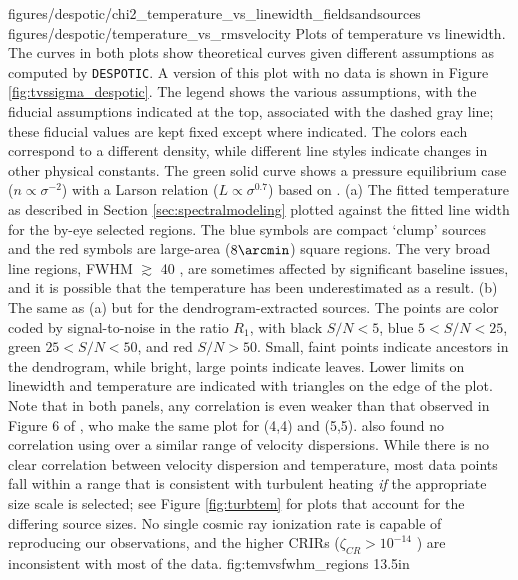 \FigureTwo
{figures/despotic/chi2_temperature_vs_linewidth_fieldsandsources} %
{figures/despotic/temperature_vs_rmsvelocity} %
{
Plots of temperature vs linewidth.  The curves in both plots show theoretical
curves given different assumptions as computed by \texttt{DESPOTIC}.  
A version of this plot with no data is shown in Figure
\ref{fig:tvssigma_despotic}.
The legend
shows the various assumptions, with the fiducial assumptions indicated at the
top, associated with the dashed gray line; these fiducial values are kept fixed
except where indicated.  The colors each correspond to a different density, while
different line styles indicate changes in other physical constants.
The green solid curve shows a pressure equilibrium case ($n\propto\sigma^{-2}$)
with a Larson relation ($L\propto\sigma^{0.7}$) based on \citet{Shetty2012a}.
(a) 
The fitted temperature as described in Section \ref{sec:spectralmodeling} plotted
against the fitted line width for the by-eye selected regions.  The blue
symbols are compact `clump' sources and the red symbols are large-area
($8\arcmin$) square regions.  The very broad line regions, FWHM $\gtrsim$ 40
\kms, are sometimes affected by significant baseline issues, and it is possible
that the temperature has been
underestimated as a result.
(b) The same as (a) but for the dendrogram-extracted sources. The points are
color coded by signal-to-noise in the ratio $R_1$, with black $S/N < 5$, blue
$5 < S/N < 25$, green $25 < S/N < 50$, and red $S/N > 50$.  Small, faint points
indicate ancestors in the dendrogram, while bright, large points indicate leaves.
Lower limits on linewidth and temperature are indicated with triangles on the
edge of the plot.  
Note that in both panels, any correlation is even weaker than that observed in
Figure 6 of \citet{Huettemeister1993a}, who make the same plot for \ammonia (4,4)
and (5,5).  \citet{Riquelme2013a} also found no correlation using \ammonia over a similar
range of velocity dispersions.
While there is no clear correlation between velocity dispersion and
temperature, most data points fall within a range that is consistent with
turbulent heating \emph{if} the appropriate size scale is selected; see Figure
\ref{fig:turbtem} for plots that account for the differing source sizes.
No single cosmic ray ionization rate is
capable of reproducing our observations, and the higher CRIRs ($\zeta_{CR} >
10^{-14}$ \pers) are inconsistent with most of the data.
}
{fig:temvsfwhm_regions}
{1}{3.5in}

